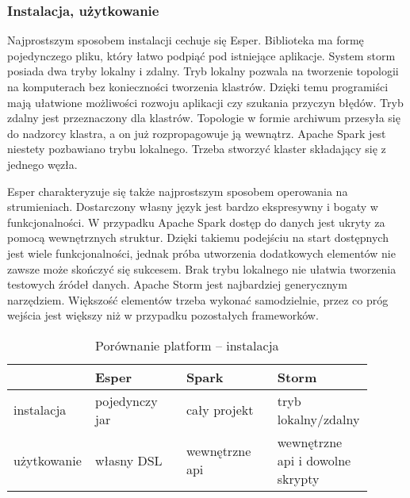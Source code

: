 \subsubsection*{Instalacja, użytkowanie}
Najprostszym sposobem instalacji cechuje się Esper.
Biblioteka ma formę pojedynczego pliku, który łatwo podpiąć pod istniejące aplikacje.
System storm posiada dwa tryby lokalny i zdalny.
Tryb lokalny pozwala na tworzenie topologii na komputerach bez konieczności tworzenia klastrów.
Dzięki temu programiści mają ułatwione możliwości rozwoju aplikacji czy szukania przyczyn błędów.
Tryb zdalny jest przeznaczony dla klastrów.
Topologie w formie archiwum przesyła się do nadzorcy klastra,
a on już rozpropagowuje ją wewnątrz.
Apache Spark jest niestety pozbawiano trybu lokalnego.
Trzeba stworzyć klaster składający się z jednego węzła.

Esper charakteryzuje się także najprostszym sposobem operowania na strumieniach.
Dostarczony własny język jest bardzo ekspresywny i bogaty w funkcjonalności.
W przypadku Apache Spark dostęp do danych jest ukryty za pomocą wewnętrznych struktur.
Dzięki takiemu podejściu na start dostępnych jest wiele funkcjonalności,
jednak próba utworzenia dodatkowych elementów nie zawsze może skończyć się sukcesem.
Brak trybu lokalnego nie ułatwia tworzenia testowych źródeł danych.
Apache Storm jest najbardziej generycznym narzędziem.
Większość elementów trzeba wykonać samodzielnie,
przez co próg wejścia jest większy niż w przypadku pozostałych frameworków.
\begin{table}[h]
  \label{tab:ProgrammingLevel}
  \begin{tabular}{p{0.2\linewidth} | p{0.25\linewidth} | p{0.25\linewidth} | p{0.2\linewidth}}
    & Esper & Spark & Storm \\
    \hline
    instalacja & pojedynczy jar & cały projekt & tryb lokalny/zdalny \\
    \hline
    użytkowanie & własny DSL & wewnętrzne api & wewnętrzne api i dowolne skrypty
  \end{tabular}
  \caption{Porównanie platform -- instalacja}
\end{table}
